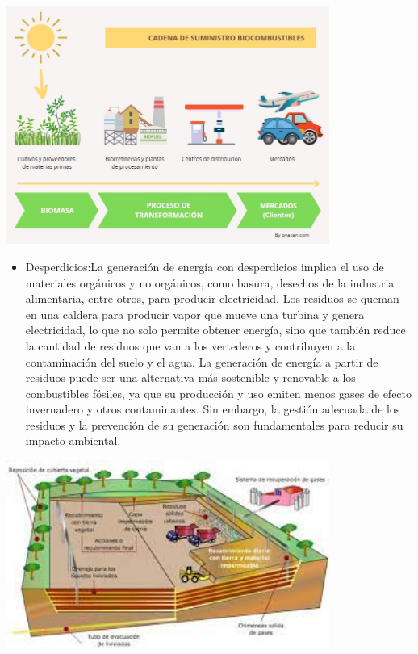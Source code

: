 \documentclass[
]{article}
\providecommand{\tightlist}{%
  \setlength{\itemsep}{0pt}\setlength{\parskip}{0pt}}
\begin{document}
\includegraphics[width=4.16667in,height=\textheight]{bio.jpeg}

\begin{itemize}
\tightlist
\item
  Desperdicios:La generación de energía con desperdicios implica el uso
  de materiales orgánicos y no orgánicos, como basura, desechos de la
  industria alimentaria, entre otros, para producir electricidad. Los
  residuos se queman en una caldera para producir vapor que mueve una
  turbina y genera electricidad, lo que no solo permite obtener energía,
  sino que también reduce la cantidad de residuos que van a los
  vertederos y contribuyen a la contaminación del suelo y el agua. La
  generación de energía a partir de residuos puede ser una alternativa
  más sostenible y renovable a los combustibles fósiles, ya que su
  producción y uso emiten menos gases de efecto invernadero y otros
  contaminantes. Sin embargo, la gestión adecuada de los residuos y la
  prevención de su generación son fundamentales para reducir su impacto
  ambiental.
\end{itemize}

\includegraphics[width=4.16667in,height=\textheight]{desper.jpeg}
\end{document}
